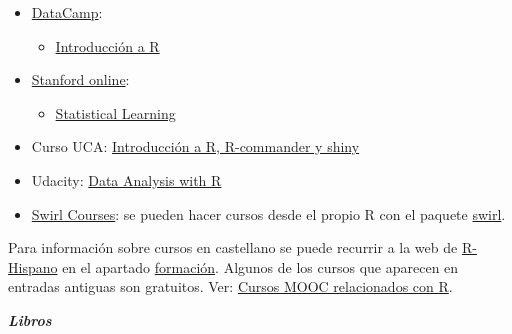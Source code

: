 \documentclass[]{book}
\providecommand{\tightlist}{%
  \setlength{\itemsep}{0pt}\setlength{\parskip}{0pt}}
\theoremstyle{definition}
\theoremstyle{definition}
\theoremstyle{definition}
\theoremstyle{remark}
\begin{document}
\begin{itemize}
\item
  \href{https://www.datacamp.com/courses}{DataCamp}:

  \begin{itemize}
  \tightlist
  \item
    \href{https://www.datacamp.com/courses/introduccion-a-r/}{Introducción
    a R}
  \end{itemize}
\end{itemize}

\begin{itemize}
\item
  \href{http://online.stanford.edu/courses}{Stanford online}:

  \begin{itemize}
  \tightlist
  \item
    \href{http://online.stanford.edu/course/statistical-learning}{Statistical
    Learning}
  \end{itemize}
\end{itemize}

\begin{itemize}
\tightlist
\item
  Curso UCA:
  \href{http://knuth.uca.es/moodle/course/view.php?id=51}{Introducción a
  R, R-commander y shiny}
\end{itemize}

\begin{itemize}
\tightlist
\item
  Udacity:
  \href{https://eu.udacity.com/course/data-analysis-with-r--ud651}{Data
  Analysis with R}
\end{itemize}

\begin{itemize}
\tightlist
\item
  \href{https://swirlstats.com/scn/title.html}{Swirl Courses}: se pueden
  hacer cursos desde el propio R con el paquete
  \href{https://swirlstats.com}{swirl}.
\end{itemize}

Para información sobre cursos en castellano se puede recurrir a la web
de \href{http://r-es.org/}{R-Hispano} en el apartado
\href{http://r-es.org/category/formacion}{formación}. Algunos de los
cursos que aparecen en entradas antiguas son gratuitos. Ver:
\href{http://r-es.org/2016/02/12/cursos-masivos-y-otra-formacion-on-line-sobre-r/}{Cursos
MOOC relacionados con R}.

\textbf{\emph{Libros}}
\end{document}
